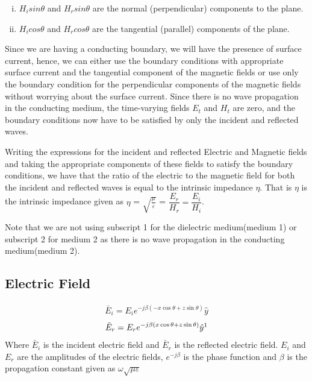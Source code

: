 \begin{enumerate}[(i)]
\item $ H_isin\theta $ and $ H_rsin\theta $  are the normal (perpendicular) components to the plane.
\item $ H_icos\theta $ and $ H_rcos\theta $ are the tangential (parallel) components of the plane.
\end{enumerate}
Since we are having a conducting boundary, we will have the presence of surface current, hence, we can either use the boundary conditions with appropriate surface current and the tangential component of the magnetic fields or use only the boundary condition for the perpendicular components of the magnetic fields without worrying about the surface current. Since there is no wave propagation in the conducting medium, the time-varying fields $E_t$ and $H_t$ are zero, and the boundary conditions now have to be satisfied by only the incident and reflected waves.

Writing the expressions for the incident and reflected Electric and Magnetic fields and taking the appropriate components of these fields to satisfy the boundary conditions, we have that the ratio of the electric to the magnetic field for both the incident and reflected waves is equal to the intrinsic impedance $\eta $. That is $ \eta $ is the intrinsic impedance given as $\eta $ = $\sqrt{\frac{\mu}{\varepsilon}}$ = $\dfrac{E_r}{H_r} = \dfrac{E_i}{H_i}$.

Note that we are not using subscript 1 for the dielectric medium(medium 1) or subscript 2 for medium 2 as there is no wave propagation in the conducting medium(medium 2).

\subsection{Electric Field}
\begin{align}
\bar{E}_i = E_i e^{-j\beta(-x\cos\theta + z\sin\theta)} \hat{y}
\label{eqn:elecincid}
\end{align}
\begin{align}
\bar{E}_r =E_r  e^{-j\beta ( x\cos\theta + z\sin\theta)} \hat{y}\footnotemark
\label{eqn:elecref}
\end{align}
Where $\bar{E}_i$ is the incident electric field and $\bar{E}_r$ is the reflected electric field. $E_i$ and $E_r$ are the amplitudes of the electric fields, $e^{-j\beta}$ is the phase function and $\beta$ is the propagation constant given as $\omega \sqrt{\mu\varepsilon}$ 

